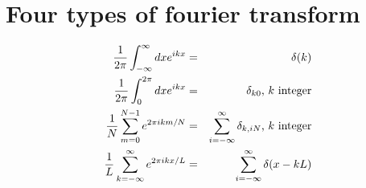 \documentclass[12pt]{article}
\begin{document}
\newcommand{\dt}[0]{\partial_t}
\newcommand{\phase}[0]{e^{-i\int_0^tE_n(t')dt'}}
\newcommand{\wps}[0]{|\psi(t)\rangle}
\newcommand{\wpsn}[0]{|\psi_n(t)\rangle}
\newcommand{\awpsm}[0]{\langle\psi_n(t)|}
\newcommand{\wPs}[0]{|\Psi(t)\rangle}

\section{Four types of fourier transform}
\begin{eqnarray}{1\over2\pi}\int_{-\infty}^\infty dxe^{ikx} &=& \delta(k) \\
{1\over2\pi}\int_0^{2\pi}dxe^{ikx} &=& \delta_{k0}\mbox{, }k\mbox{ integer} \\
{1\over N}\sum_{m=0}^{N-1}e^{2\pi ikm/N} &=& \sum_{i=-\infty}^\infty\delta_{k,iN}\mbox{, }k\mbox{ integer} \\
{1\over L}\sum_{k=-\infty}^\infty e^{2\pi ikx/L} &=& \sum_{i=-\infty}^\infty\delta(x-kL) \\
\end{eqnarray}

\end{document}
